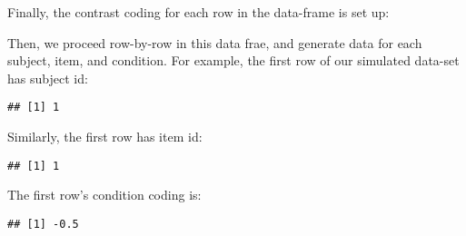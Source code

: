 \documentclass[12pt,]{krantz}
\newenvironment{Shaded}{\begin{snugshade}}{\end{snugshade}}
\newcommand{\CommentTok}[1]{\textcolor[rgb]{0.56,0.35,0.01}{\textit{#1}}}
\newcommand{\DecValTok}[1]{\textcolor[rgb]{0.00,0.00,0.81}{#1}}
\newcommand{\KeywordTok}[1]{\textcolor[rgb]{0.13,0.29,0.53}{\textbf{#1}}}
\newcommand{\NormalTok}[1]{#1}
\newcommand{\OperatorTok}[1]{\textcolor[rgb]{0.81,0.36,0.00}{\textbf{#1}}}
\newcommand{\StringTok}[1]{\textcolor[rgb]{0.31,0.60,0.02}{#1}}
\begin{document}
Finally, the contrast coding for each row in the data-frame is set up:

\begin{Shaded}
\end{Shaded}

Then, we proceed row-by-row in this data frae, and generate data for each subject, item, and condition. For example, the first row of our simulated data-set has subject id:

\begin{Shaded}
\end{Shaded}

\begin{verbatim}
## [1] 1
\end{verbatim}

Similarly, the first row has item id:

\begin{Shaded}
\end{Shaded}

\begin{verbatim}
## [1] 1
\end{verbatim}

The first row's condition coding is:

\begin{Shaded}
\end{Shaded}

\begin{verbatim}
## [1] -0.5
\end{verbatim}
\end{document}

